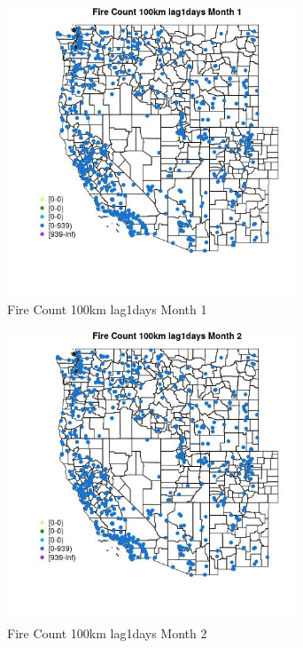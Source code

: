 \begin{figure} 
\centering  
\includegraphics[width=0.77\textwidth]{Code_Outputs/Report_ML_input_PM25_Step4_part_e_de_duplicated_aves_compiled_2019-05-21wNAs_MapObsMo1Fire_Count_100km_lag1days.jpg} 
\caption{\label{fig:Report_ML_input_PM25_Step4_part_e_de_duplicated_aves_compiled_2019-05-21wNAsMapObsMo1Fire_Count_100km_lag1days}Fire Count 100km lag1days Month 1} 
\end{figure} 
 

\begin{figure} 
\centering  
\includegraphics[width=0.77\textwidth]{Code_Outputs/Report_ML_input_PM25_Step4_part_e_de_duplicated_aves_compiled_2019-05-21wNAs_MapObsMo2Fire_Count_100km_lag1days.jpg} 
\caption{\label{fig:Report_ML_input_PM25_Step4_part_e_de_duplicated_aves_compiled_2019-05-21wNAsMapObsMo2Fire_Count_100km_lag1days}Fire Count 100km lag1days Month 2} 
\end{figure} 
 

